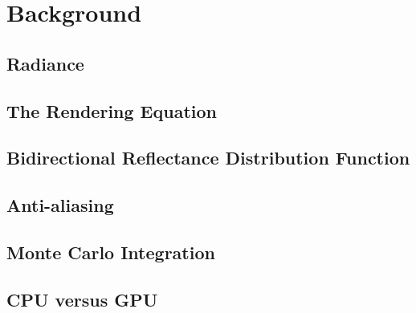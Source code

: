 \chapter{Background}

\section{Radiance}

\section{The Rendering Equation}

\section{Bidirectional Reflectance Distribution Function}

\section{Anti-aliasing}

\section{Monte Carlo Integration}

\section{CPU versus GPU}
\label{sec:cpu_v_gpu}

